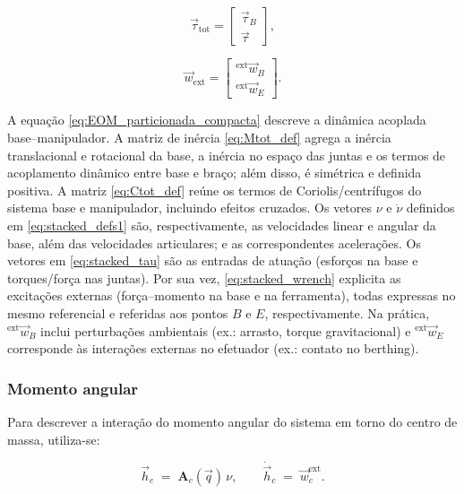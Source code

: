 \begin{equation}
\label{eq:stacked_tau}
\vec\tau_{\text{tot}} =
\begin{bmatrix}
\vec \tau_{B} \\
\vec \tau
\end{bmatrix},
\end{equation}

\begin{equation}
\label{eq:stacked_wrench}
\vec w_{\text{ext}} =
\begin{bmatrix}
{}^{\text{ext}}\vec w_{B} \\
{}^{\text{ext}}\vec w_{E}
\end{bmatrix}.
\end{equation}

A equação \eqref{eq:EOM_particionada_compacta} descreve a dinâmica acoplada base--manipulador.
A matriz de inércia \eqref{eq:Mtot_def} agrega a inércia translacional e rotacional da base, a inércia no espaço das juntas e os termos de acoplamento dinâmico entre base e braço; além disso, é simétrica e definida positiva.
A matriz \eqref{eq:Ctot_def} reúne os termos de Coriolis/centrífugos do sistema base e manipulador, incluindo efeitos cruzados.
Os vetores $\nu$ e $\dot{\nu}$ definidos em \eqref{eq:stacked_defs1} são, respectivamente, as velocidades linear e angular da base, além das velocidades articulares; e as correspondentes acelerações.
Os vetores em \eqref{eq:stacked_tau} são as entradas de atuação (esforços na base e torques/força nas juntas).
Por sua vez, \eqref{eq:stacked_wrench} explicita as excitações externas (força--momento na base e na ferramenta), todas expressas no mesmo referencial e referidas aos pontos $B$ e $E$, respectivamente.
Na prática, ${}^{\text{ext}}\vec w_{B}$ inclui perturbações ambientais (ex.: arrasto, torque gravitacional) 
e ${}^{\text{ext}}\vec w_{E}$ corresponde às interações externas no efetuador (ex.: contato no berthing).

\subsubsection{Momento angular}
Para descrever a interação do momento angular do sistema em torno do centro de massa, utiliza-se:

\begin{equation}
\label{eq:centroidal}
\vec h_{c}
\;=\;
\mathbf A_{c}(\vec q)\,\nu,
\qquad
\dot{\vec h}_{c} \;=\; \vec w^{\text{ext}}_{c}.
\end{equation}

